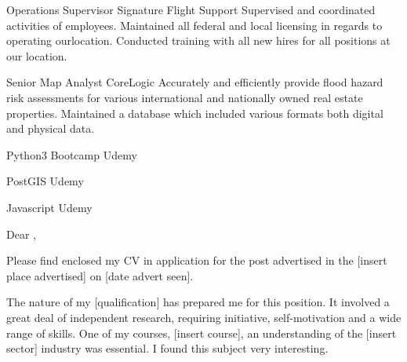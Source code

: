 \documentclass[letterpaper]{ReadableCV}
\begin{document}
{Operations Supervisor}
{Signature Flight Support}
{Supervised and coordinated activities of employees. Maintained all federal and local licensing in regards to operating ourlocation. Conducted training with all new hires for all positions at our location.}


{Senior Map Analyst}
{CoreLogic}
{Accurately and efficiently provide flood hazard risk assessments for various international and nationally owned real estate properties. Maintained a database which included various formats both digital and physical data.}



{Python3 Bootcamp}
{Udemy}{}

{PostGIS}
{Udemy}{}

{Javascript}
{Udemy}{}

         
          
\clearpage
 
 
\showHeader




\makeLetter

Dear \recpname,

\bigskip

Please find enclosed my CV in application for the post advertised in the [insert place advertised] on [date advert seen].

The nature of my [qualification] has prepared me for this position. It involved a great deal of independent research, requiring initiative, self-motivation and a wide range of skills. One of my courses, [insert course], an understanding of the [insert sector] industry was essential. I found this subject very interesting.
\end{document}
